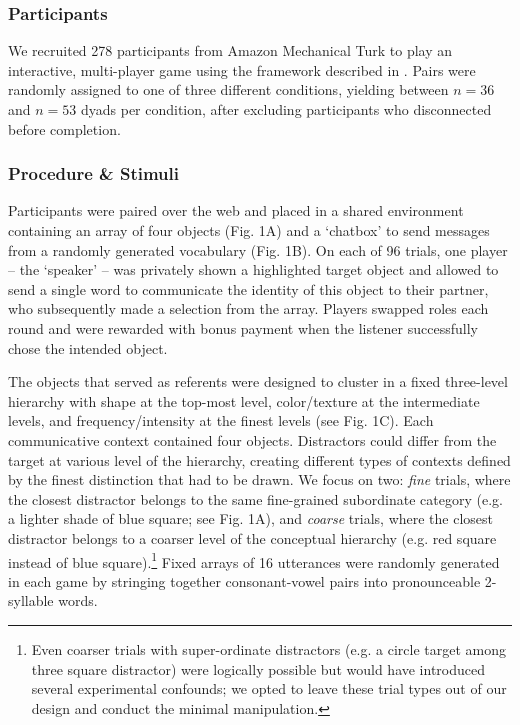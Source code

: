 \documentclass[10pt,letterpaper]{article}
\begin{document}
\subsubsection{Participants}

We recruited 278 participants from Amazon Mechanical Turk to play an interactive, multi-player game using the framework described in . Pairs were randomly assigned to one of three different conditions, yielding between $n=36$ and $n=53$ dyads per condition, after excluding participants who disconnected before completion.

\subsubsection{Procedure \& Stimuli}
Participants were paired over the web and placed in a shared environment containing an array of four objects (Fig. 1A) and a `chatbox' to send messages from a randomly generated vocabulary (Fig. 1B). On each of 96 trials, one player -- the `speaker' -- was privately shown a highlighted target object and allowed to send a single word to communicate the identity of this object to their partner, who subsequently made a selection from the array. Players swapped roles each round and were rewarded with bonus payment when the listener successfully chose the intended object.

The objects that served as referents were designed to cluster in a fixed three-level hierarchy with shape at the top-most level, color/texture at the intermediate levels, and frequency/intensity at the finest levels (see Fig. 1C). Each communicative context contained four objects. Distractors could differ from the target at various level of the hierarchy, creating different types of contexts defined by the finest distinction that had to be drawn. We focus on two: \emph{fine} trials, where the closest distractor belongs to the same fine-grained subordinate category (e.g. a lighter shade of blue square; see Fig. 1A), and \emph{coarse} trials, where the closest distractor belongs to a coarser level of the conceptual hierarchy (e.g. red square instead of blue square).\footnote{Even coarser trials with super-ordinate distractors (e.g. a circle target among three square distractor) were logically possible but would have introduced several experimental confounds; we opted to leave these trial types out of our design and conduct the minimal manipulation.} Fixed arrays of 16 utterances were randomly generated in each game by stringing together consonant-vowel pairs into pronounceable 2-syllable words.
\end{document}
